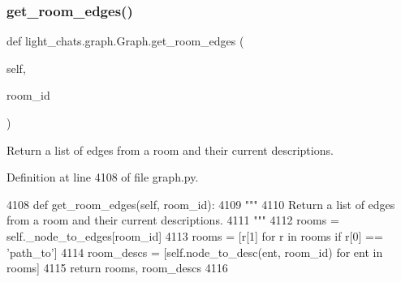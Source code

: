 \mbox{\label{classlight__chats_1_1graph_1_1Graph_a1d2efb53425d6f495516d656124413c0}} 
\subsubsection{\texorpdfstring{get\+\_\+room\+\_\+edges()}{get\_room\_edges()}}
{\footnotesize\ttfamily def light\+\_\+chats.\+graph.\+Graph.\+get\+\_\+room\+\_\+edges (\begin{DoxyParamCaption}\item[{}]{self,  }\item[{}]{room\+\_\+id }\end{DoxyParamCaption})}

\begin{DoxyVerb}Return a list of edges from a room and their current descriptions.
\end{DoxyVerb}
 

Definition at line 4108 of file graph.\+py.


\begin{DoxyCode}
4108     \textcolor{keyword}{def }get\_room\_edges(self, room\_id):
4109         \textcolor{stringliteral}{"""}
4110 \textcolor{stringliteral}{        Return a list of edges from a room and their current descriptions.}
4111 \textcolor{stringliteral}{        """}
4112         rooms = self.\_node\_to\_edges[room\_id]
4113         rooms = [r[1] \textcolor{keywordflow}{for} r \textcolor{keywordflow}{in} rooms \textcolor{keywordflow}{if} r[0] == \textcolor{stringliteral}{'path\_to'}]
4114         room\_descs = [self.node\_to\_desc(ent, room\_id) \textcolor{keywordflow}{for} ent \textcolor{keywordflow}{in} rooms]
4115         \textcolor{keywordflow}{return} rooms, room\_descs
4116 
\end{DoxyCode}
\mbox{\label{classlight__chats_1_1graph_1_1Graph_a4d24052d36cff3896424e2e3bce2d554}} 
